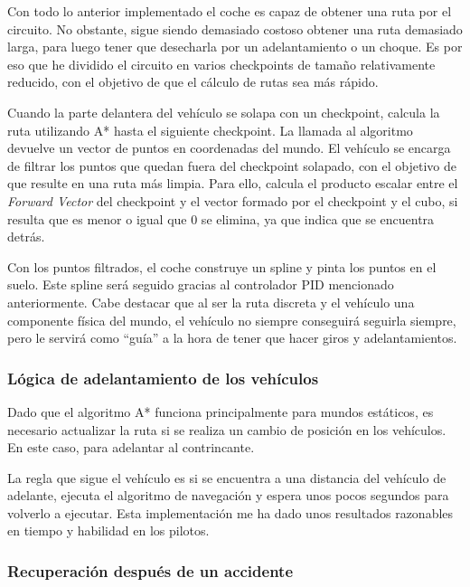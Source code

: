 Con todo lo anterior implementado el coche es capaz de obtener una ruta por el circuito. No obstante, sigue siendo demasiado costoso obtener una ruta demasiado larga, para luego tener que desecharla por un adelantamiento o un choque. Es por eso que he dividido el circuito en varios checkpoints de tamaño relativamente reducido, con el objetivo de que el cálculo de rutas sea más rápido.

\bigskip

Cuando la parte delantera del vehículo se solapa con un checkpoint, calcula la ruta utilizando A* hasta el siguiente checkpoint. La llamada al algoritmo devuelve un vector de puntos en coordenadas del mundo. El vehículo se encarga de filtrar los puntos que quedan fuera del checkpoint solapado, con el objetivo de que resulte en una ruta más limpia. Para ello, calcula el producto escalar entre el \textit{Forward Vector} del checkpoint y el vector formado por el checkpoint y el cubo, si resulta que es menor o igual que 0 se elimina, ya que indica que se encuentra detrás.

\bigskip

Con los puntos filtrados, el coche construye un spline y pinta los puntos en el suelo. Este spline será seguido gracias al controlador PID mencionado anteriormente. Cabe destacar que al ser la ruta discreta y el vehículo una componente física del mundo, el vehículo no siempre conseguirá seguirla siempre, pero le servirá como ``guía'' a la hora de tener que hacer giros y adelantamientos.

\subsubsection{Lógica de adelantamiento de los vehículos}

Dado que el algoritmo A* funciona principalmente para mundos estáticos, es necesario actualizar la ruta si se realiza un cambio de posición en los vehículos. En este caso, para adelantar al contrincante.

\bigskip

La regla que sigue el vehículo es si se encuentra a una distancia del vehículo de adelante, ejecuta el algoritmo de navegación y espera unos pocos segundos para volverlo a ejecutar. Esta implementación me ha dado unos resultados razonables en tiempo y habilidad en los pilotos.

\subsubsection{Recuperación después de un accidente}

